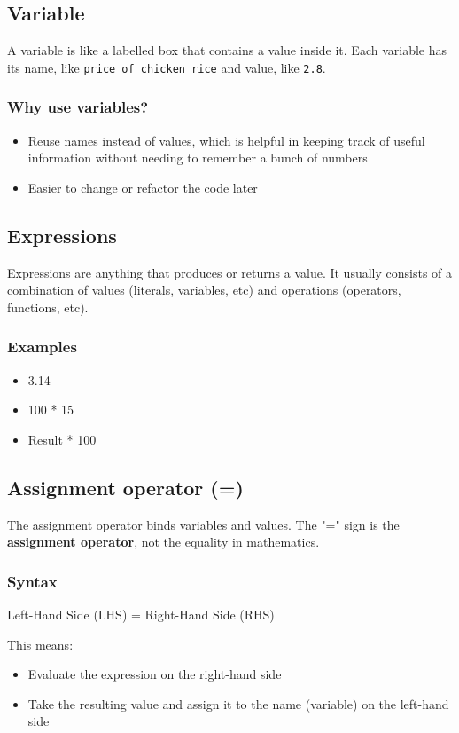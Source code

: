 \documentclass[11pt]{article}
\begin{document}
\subsection{Variable}
\label{sec:org879b5d4}
A variable is like a labelled box that contains a value inside it. Each variable has its name, like \texttt{price\_of\_chicken\_rice} and value, like \texttt{2.8}.
\subsubsection{Why use variables?}
\label{sec:orgbc1766c}
\begin{itemize}
\item Reuse names instead of values, which is helpful in keeping track of useful information without needing to remember a bunch of numbers
\item Easier to change or refactor the code later
\end{itemize}
\subsection{Expressions}
\label{sec:orgdbc9b12}
Expressions are anything that produces or returns a value. It usually consists of a combination of values (literals, variables, etc) and operations (operators, functions, etc).
\subsubsection{Examples}
\label{sec:org0350376}
\begin{itemize}
\item 3.14
\item 100 * 15
\item Result * 100
\end{itemize}
\subsection{Assignment operator (=)}
\label{sec:orgb137dee}
The assignment operator binds variables and values. The "=" sign is the \textbf{assignment operator}, not the equality in mathematics.
\subsubsection{Syntax}
\label{sec:org3c07a4c}
Left-Hand Side (LHS) = Right-Hand Side (RHS)

This means:
\begin{itemize}
\item Evaluate the expression on the right-hand side
\item Take the resulting value and assign it to the name (variable) on the left-hand side
\end{itemize}
\end{document}
